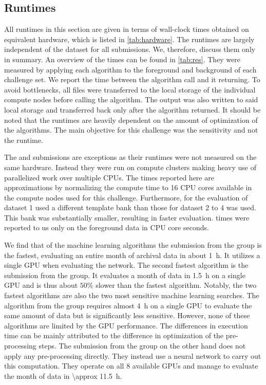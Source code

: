 \subsection{Runtimes}
All runtimes in this section are given in terms of wall-clock times obtained on equivalent hardware, which is listed in \autoref{tab:hardware}. The  runtimes are largely independent of the dataset for all submissions. We, therefore, discuss them only in summary. An overview of the times can be found in \autoref{tab:res}. They were measured by applying each algorithm to the foreground and background of each challenge set. We report the time between the algorithm call and it returning. To avoid bottlenecks, all files were transferred to the local storage of the individual compute nodes before calling the algorithm. The output was also written to said local storage and transferred back only after the algorithm returned. It should be noted that the runtimes are heavily dependent on the amount of optimization of the algorithms. The main objective for this challenge was the sensitivity and not the runtime.

The \pycbc and \cwb submissions are exceptions as their runtimes were not measured on the same hardware. Instead they were run on compute clusters making heavy use of parallelized work over multiple CPUs. The times reported here are approximations by normalizing the compute time to 16 CPU cores available in the compute nodes used for this challenge. Furthermore, for the evaluation of dataset 1 \pycbc used a different template bank than those for dataset 2 to 4 was used. This bank was substantially smaller, resulting in faster evaluation. \cwb times were reported to us only on the foreground data in CPU core seconds.

We find that of the machine learning algorithms the submission from the \jena group is the fastest, evaluating an entire month of archival data in about \SI{1}{\hour}. It utilizes a single GPU when evaluating the network. The second fastest algorithm is the submission from the \virgo group. It evaluates a month of data in \SI{1.5}{\hour} on a single GPU and is thus about $50\%$ slower than the fastest algorithm. Notably, the two fastest algorithms are also the two most sensitive machine learning searches. The algorithm from the \cnn group requires almost \SI{4}{\hour} on a single GPU to evaluate the same amount of data but is significantly less sensitive. However, none of these algorithms are limited by the GPU performance. The differences in execution time can be mainly attributed to the difference in optimization of the pre-processing steps. The submission from the \mfcnn group on the other hand does not apply any pre-processing directly. They instead use a neural network to carry out this computation. They operate on all 8 available GPUs and manage to evaluate the month of data in \SI[parse-numbers=false]{\approx 11.5}{\hour}.

